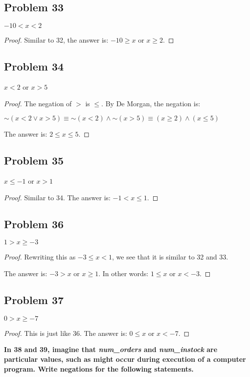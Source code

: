 \documentclass[14pt]{extarticle}
\begin{document}
\subsection{Problem 33}
$-10 < x < 2$

\begin{proof}
Similar to 32, the answer is: $-10 \geq x$ or $x \geq 2$.
\end{proof}

\subsection{Problem 34}
$x < 2$ or $x > 5$

\begin{proof}
The negation of $>$ is $\leq$. By De Morgan, the negation is:

${\sim(x < 2 \vee x > 5)} \equiv {\sim (x < 2)} \wedge {\sim (x > 5)} \equiv (x \geq 2) \wedge (x \leq 5)$

The answer is: $2 \leq x \leq 5$.
\end{proof}

\subsection{Problem 35}
$x \leq -1$ or $x > 1$

\begin{proof}
Similar to 34. The answer is: $-1 < x \leq 1$.
\end{proof}

\subsection{Problem 36}
$1 > x \geq -3$

\begin{proof}
Rewriting this as $-3 \leq x < 1$, we see that it is similar to 32 and 33.

The answer is: $-3 > x$ or $x \geq 1$. In other words: $1 \leq x$ or $x < -3$.
\end{proof}

\subsection{Problem 37}
$0 > x \geq -7$

\begin{proof}
This is just like 36. The answer is: $0 \leq x$ or $x < -7$.
\end{proof}

{\bf In 38 and 39, imagine that {\it num\_orders} and {\it num\_instock} are particular values, such as might occur during execution of a computer program. Write negations for the following statements.}
\end{document}
